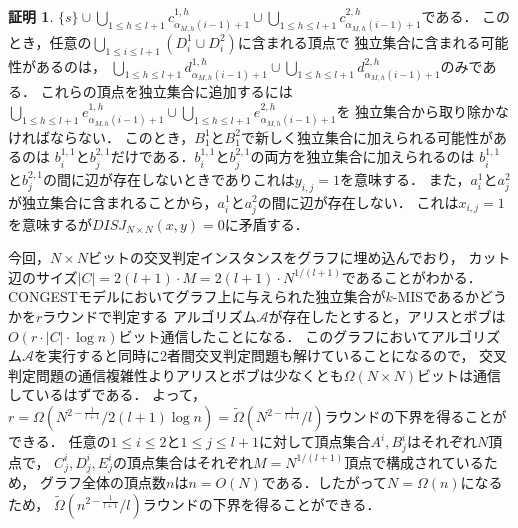\documentclass[12pt]{thesis}
\newcommand{\CONGEST}{\textsf{CONGEST}}
\theoremstyle{definition}
\newtheorem*{prf*}{証明}
\begin{document}
\begin{prf*}
$\{s\} \cup \bigcup_{1\leq h \leq l+1} c^{1,h}_{\alpha_{M,h}(i-1)+1} \cup 
\bigcup_{1\leq h \leq l+1} c^{2,h}_{\alpha_{M,h}(i-1)+1}$である．
このとき，任意の$\bigcup_{1 \leq i \leq l+1}(D^{1}_{i}\cup D^{2}_{i})$に含まれる頂点で
独立集合に含まれる可能性があるのは，
$\bigcup_{1\leq h \leq l+1} d^{1,h}_{\alpha_{M,h}(i-1)+1}\cup 
\bigcup_{1\leq h \leq l+1} d^{2,h}_{\alpha_{M,h}(i-1)+1}$のみである．
これらの頂点を独立集合に追加するには
$\bigcup_{1\leq h \leq l+1} e^{1,h}_{\alpha_{M,h}(i-1)+1}\cup 
\bigcup_{1\leq h \leq l+1} e^{2,h}_{\alpha_{M,h}(i-1)+1}$を
独立集合から取り除かなければならない．
このとき，$B^{1}_{1}$と$B^{2}_{1}$で新しく独立集合に加えられる可能性があるのは
$b^{1,1}_{i}$と$b^{2,1}_{j}$だけである．$b^{1,1}_{i}$と$b^{2,1}_{j}$の両方を独立集合に加えられるのは
$b^{1,1}_{i}$と$b^{2,1}_{j}$の間に辺が存在しないときでありこれは$y_{i,j}=1$を意味する．
また，$a^{1}_{i}$と$a^{2}_{j}$が独立集合に含まれることから，$a^{1}_{i}$と$a^{2}_{j}$の間に辺が存在しない．
これは$x_{i,j}=1$を意味するが$DISJ_{N\times N}(x,y)=0$に矛盾する．

今回，$N \times N$ビットの交叉判定インスタンスをグラフに埋め込んでおり，
カット辺のサイズ$|C| = 2(l + 1) \cdot M = 2(l + 1) \cdot N^{1/(l + 1)}$であることがわかる．
{\CONGEST}モデルにおいてグラフ上に与えられた独立集合が$k$-MISであるかどうかを$r$ラウンドで判定する
アルゴリズム$\mathcal{A}$が存在したとすると，アリスとボブは$O(r \cdot |C| \cdot \log n)$ビット通信したことになる．
このグラフにおいてアルゴリズム$\mathcal{A}$を実行すると同時に2者間交叉判定問題も解けていることになるので，
交叉判定問題の通信複雑性よりアリスとボブは少なくとも$\Omega (N \times N)$ビットは通信しているはずである．
よって，$r = \Omega \left(N^{2 - \frac{1}{l + 1}} / 2( l + 1)\log n\right) = \tilde{\Omega}\left(N^{2 - \frac{1}{l + 1}}/l\right)$ラウンドの下界を得ることができる．
任意の$1\leq i \leq 2$と$1\leq j \leq l+1$に対して頂点集合$A^{i}, B^{i}_{j}$はそれぞれ$N$頂点で，
$C^{i}_{j},D^{i}_{j},E^{i}_{j}$の頂点集合はそれぞれ$M=N^{1/(l + 1)}$頂点で構成されているため，
グラフ全体の頂点数$n$は$n = O(N)$である．したがって$N = \Omega(n)$になるため，
$\tilde{\Omega}\left(n^{2 - \frac{1}{l + 1}}/l\right)$ラウンドの下界を得ることができる．
\end{prf*}
\newpage
\end{document}
